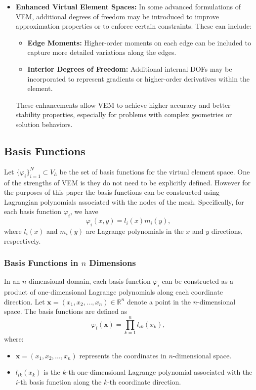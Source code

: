 \documentclass[class=article, crop=false]{standalone}
\begin{document}
\begin{itemize}
    \item \textbf{Enhanced Virtual Element Spaces:}
    In some advanced formulations of VEM, additional degrees of freedom may be introduced to improve approximation properties or to enforce certain constraints. These can include:
    \begin{itemize}
        \item \textbf{Edge Moments:} Higher-order moments on each edge can be included to capture more detailed variations along the edges.
        \item \textbf{Interior Degrees of Freedom:} Additional internal DOFs may be incorporated to represent gradients or higher-order derivatives within the element.
    \end{itemize}
    These enhancements allow VEM to achieve higher accuracy and better stability properties, especially for problems with complex geometries or solution behaviors.
\end{itemize}

\subsection{Basis Functions}
Let $\{\varphi_i\}_{i=1}^{N} \subset V_h$ be the set of basis functions for the virtual element space. One of the strengths of VEM is they do not need to be explicitly defined. However for the purposes of this paper the basis functions can be constructed using Lagrangian polynomials associated with the nodes of the mesh. Specifically, for each basis function $\varphi_i$, we have
$$
\varphi_i(x, y) = l_i(x) m_i(y),
$$
where $l_i(x)$ and $m_i(y)$ are Lagrange polynomials in the $x$ and $y$ directions, respectively.

\subsubsection{Basis Functions in $n$ Dimensions}
In an $n$-dimensional domain, each basis function $\varphi_i$ can be constructed as a product of one-dimensional Lagrange polynomials along each coordinate direction. Let $\mathbf{x} = (x_1, x_2, \ldots, x_n) \in \mathbb{R}^n$ denote a point in the $n$-dimensional space. The basis functions are defined as
\[
\varphi_i(\mathbf{x}) = \prod_{k=1}^{n} l_{ik}(x_k),
\]
where:
\begin{itemize}
    \item $\mathbf{x} = (x_1, x_2, \ldots, x_n)$ represents the coordinates in $n$-dimensional space.
    \item $l_{ik}(x_k)$ is the $k$-th one-dimensional Lagrange polynomial associated with the $i$-th basis function along the $k$-th coordinate direction.
\end{itemize}
\end{document}
